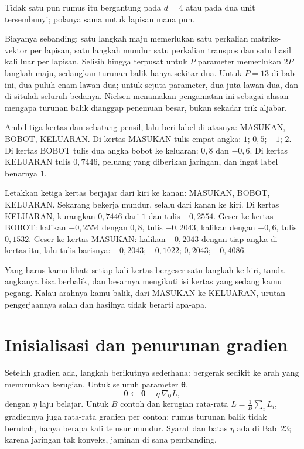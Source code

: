 Tidak satu pun rumus itu bergantung pada $d=4$ atau pada dua unit tersembunyi; polanya sama untuk lapisan mana pun.

Biayanya sebanding: satu langkah maju memerlukan satu perkalian matriks-vektor per lapisan, satu langkah mundur satu perkalian transpos dan satu hasil kali luar per lapisan. Selisih hingga terpusat untuk $P$ parameter memerlukan $2P$ langkah maju, sedangkan turunan balik hanya sekitar dua. Untuk $P=13$ di bab ini, dua puluh enam lawan dua; untuk sejuta parameter, dua juta lawan dua, dan di situlah seluruh bedanya. Nielsen menamakan pengamatan ini sebagai alasan mengapa turunan balik dianggap
penemuan besar, bukan sekadar trik aljabar.

\begin{tangan}
Ambil tiga kertas dan sebatang pensil, lalu beri label di atasnya: MASUKAN, BOBOT,
KELUARAN. Di kertas MASUKAN tulis empat angka: $1$; $0{,}5$; $-1$; $2$. Di kertas BOBOT
tulis dua angka bobot ke keluaran: $0{,}8$ dan $-0{,}6$. Di kertas KELUARAN tulis
$0{,}7446$, peluang yang diberikan jaringan, dan ingat label benarnya $1$.

Letakkan ketiga kertas berjajar dari kiri ke kanan: MASUKAN, BOBOT, KELUARAN. Sekarang
bekerja mundur, selalu dari kanan ke kiri. Di kertas KELUARAN, kurangkan $0{,}7446$ dari
$1$ dan tulis $-0{,}2554$. Geser ke kertas BOBOT: kalikan $-0{,}2554$ dengan $0{,}8$,
tulis $-0{,}2043$; kalikan dengan $-0{,}6$, tulis $0{,}1532$. Geser ke kertas MASUKAN:
kalikan $-0{,}2043$ dengan tiap angka di kertas itu, lalu tulis barisnya: $-0{,}2043$;
$-0{,}1022$; $0{,}2043$; $-0{,}4086$.

Yang harus kamu lihat: setiap kali kertas bergeser satu langkah ke kiri, tanda angkanya
bisa berbalik, dan besarnya mengikuti isi kertas yang sedang kamu pegang. Kalau arahnya
kamu balik, dari MASUKAN ke KELUARAN, urutan pengerjaannya salah dan hasilnya tidak
berarti apa-apa.
\end{tangan}


\section{Inisialisasi dan penurunan gradien}

Setelah gradien ada, langkah berikutnya sederhana: bergerak sedikit ke arah yang menurunkan
kerugian. Untuk seluruh parameter $\boldsymbol{\theta}$,
\[
  \boldsymbol{\theta}\leftarrow\boldsymbol{\theta}-\eta\,\nabla_{\boldsymbol{\theta}}L,
\]
dengan $\eta$ laju belajar. Untuk $B$ contoh dan kerugian rata-rata
$L=\frac{1}{B}\sum_{i}L_{i}$, gradiennya juga rata-rata gradien per contoh; rumus
turunan balik tidak berubah, hanya berapa kali telusur mundur.
Syarat dan batas $\eta$ ada di Bab~23; karena jaringan tak
konveks, jaminan di sana pembanding.

